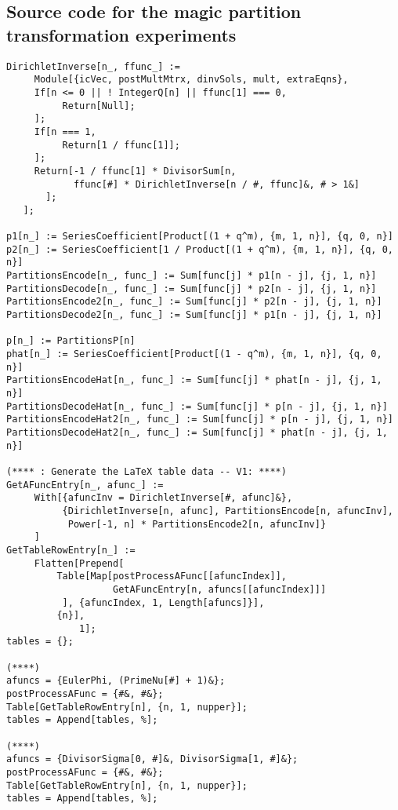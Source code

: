 \documentclass[12pt,reqno,a4letter]{article}
\numberwithin{figure}{section}
\numberwithin{table}{section}
\numberwithin{equation}{section}
\theoremstyle{plain}
\numberwithin{theorem}{section}
\theoremstyle{definition}
\begin{document}
\subsection{Source code for the magic partition transformation experiments}

\begin{lstlisting}[caption={Mathematica code for the magic partitions tables}]
DirichletInverse[n_, ffunc_] := 
     Module[{icVec, postMultMtrx, dinvSols, mult, extraEqns},
     If[n <= 0 || ! IntegerQ[n] || ffunc[1] === 0, 
          Return[Null];
     ];
     If[n === 1, 
          Return[1 / ffunc[1]];
     ];
     Return[-1 / ffunc[1] * DivisorSum[n, 
            ffunc[#] * DirichletInverse[n / #, ffunc]&, # > 1&]
	   ];
   ];

p1[n_] := SeriesCoefficient[Product[(1 + q^m), {m, 1, n}], {q, 0, n}]
p2[n_] := SeriesCoefficient[1 / Product[(1 + q^m), {m, 1, n}], {q, 0, n}]
PartitionsEncode[n_, func_] := Sum[func[j] * p1[n - j], {j, 1, n}]
PartitionsDecode[n_, func_] := Sum[func[j] * p2[n - j], {j, 1, n}]
PartitionsEncode2[n_, func_] := Sum[func[j] * p2[n - j], {j, 1, n}]
PartitionsDecode2[n_, func_] := Sum[func[j] * p1[n - j], {j, 1, n}]

p[n_] := PartitionsP[n]
phat[n_] := SeriesCoefficient[Product[(1 - q^m), {m, 1, n}], {q, 0, n}]
PartitionsEncodeHat[n_, func_] := Sum[func[j] * phat[n - j], {j, 1, n}]
PartitionsDecodeHat[n_, func_] := Sum[func[j] * p[n - j], {j, 1, n}]
PartitionsEncodeHat2[n_, func_] := Sum[func[j] * p[n - j], {j, 1, n}]
PartitionsDecodeHat2[n_, func_] := Sum[func[j] * phat[n - j], {j, 1, n}]

(**** : Generate the LaTeX table data -- V1: ****)
GetAFuncEntry[n_, afunc_] := 
     With[{afuncInv = DirichletInverse[#, afunc]&}, 
          {DirichletInverse[n, afunc], PartitionsEncode[n, afuncInv], 
           Power[-1, n] * PartitionsEncode2[n, afuncInv]}
	 ]
GetTableRowEntry[n_] := 
     Flatten[Prepend[
	     Table[Map[postProcessAFunc[[afuncIndex]], 
	               GetAFuncEntry[n, afuncs[[afuncIndex]]]
		  ], {afuncIndex, 1, Length[afuncs]}], 
	     {n}], 
             1];
tables = {};

(****)
afuncs = {EulerPhi, (PrimeNu[#] + 1)&};
postProcessAFunc = {#&, #&};
Table[GetTableRowEntry[n], {n, 1, nupper}];
tables = Append[tables, %];

(****)
afuncs = {DivisorSigma[0, #]&, DivisorSigma[1, #]&};
postProcessAFunc = {#&, #&};
Table[GetTableRowEntry[n], {n, 1, nupper}];
tables = Append[tables, %];


\end{lstlisting}
\end{document}
